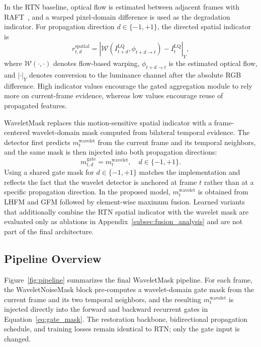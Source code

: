 {In the RTN baseline, optical flow is estimated between adjacent frames with RAFT~\cite{teed2020raft}, and a warped pixel-domain difference is used as the degradation indicator. For propagation direction $d\in\{-1,+1\}$, the directed spatial indicator is
\begin{equation}\label{eq:baseline_indicator}
    r_{t,d}^{\mathrm{spatial}} = \left|\mathcal{W}\!\left(I_{t+d}^{\mathrm{LQ}},\phi_{t+d\to t}\right)-I_t^{\mathrm{LQ}}\right|_{Y},
\end{equation}
where $\mathcal{W}(\cdot,\cdot)$ denotes flow-based warping, $\phi_{t+d\to t}$ is the estimated optical flow, and $|\cdot|_{Y}$ denotes conversion to the luminance channel after the absolute RGB difference. High indicator values encourage the gated aggregation module to rely more on current-frame evidence, whereas low values encourage reuse of propagated features.

WaveletMask replaces this motion-sensitive spatial indicator with a frame-centered wavelet-domain mask computed from bilateral temporal evidence. The detector first predicts $m_t^{\mathrm{wavelet}}$ from the current frame and its temporal neighbors, and the same mask is then injected into both propagation directions:
\begin{equation}\label{eq:gate_mask}
    m_{t,d}^{\mathrm{gate}} = m_t^{\mathrm{wavelet}}, \quad d\in\{-1,+1\}.
\end{equation}
Using a shared gate mask for $d\in\{-1,+1\}$ matches the implementation and reflects the fact that the wavelet detector is anchored at frame $t$ rather than at a specific propagation direction. In the proposed model, $m_t^{\mathrm{wavelet}}$ is obtained from LHFM and GFM followed by element-wise maximum fusion. Learned variants that additionally combine the RTN spatial indicator with the wavelet mask are evaluated only as ablations in Appendix~\ref{subsec:fusion_analysis} and are not part of the final architecture.

\subsection{Pipeline Overview}\label{subsec:overview}

Figure~\ref{fig:pipeline} summarizes the final WaveletMask pipeline. For each frame, the WaveletNoiseMask block pre-computes a wavelet-domain gate mask from the current frame and its two temporal neighbors, and the resulting $m_t^{\mathrm{wavelet}}$ is injected directly into the forward and backward recurrent gates in Equation~\eqref{eq:gate_mask}. The restoration backbone, bidirectional propagation schedule, and training losses remain identical to RTN; only the gate input is changed.

}
